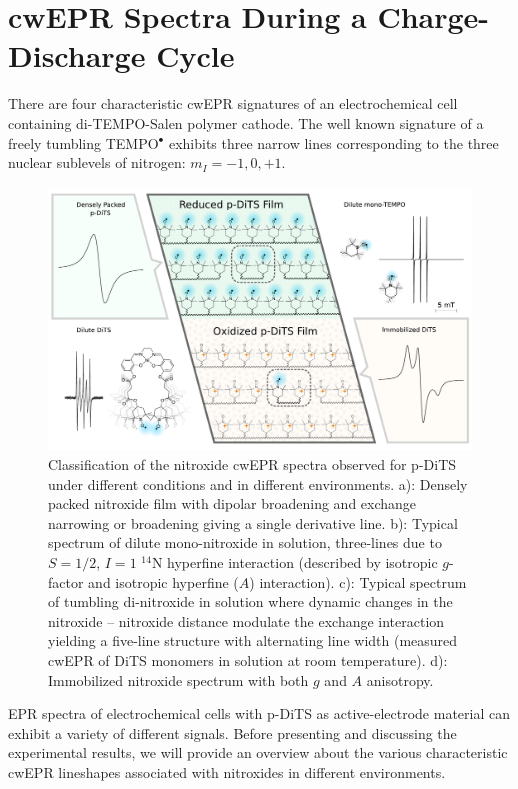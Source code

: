 \section{cwEPR Spectra During a Charge-Discharge Cycle}
There are four characteristic cwEPR signatures of an electrochemical cell containing di-TEMPO-Salen polymer cathode. The well known signature of a freely tumbling TEMPO$^{\bullet}$ exhibits three narrow lines corresponding to the three nuclear sublevels of nitrogen: $m_I=-1,0,+1$.
\begin{figure}[h]
\center
	\includegraphics[width=1\textwidth]{./operando_epr/figures/Cartoon_ALL.pdf}
	\caption{Classification of the nitroxide cwEPR spectra observed for p-DiTS under different conditions and in different environments. a): Densely packed nitroxide film with dipolar broadening and exchange narrowing or broadening giving a single derivative line. b): Typical spectrum of dilute mono-nitroxide in solution, three-lines due to $S=1/2$, $I=1$ $^{14}$N hyperfine interaction (described by isotropic $g$-factor and isotropic hyperfine ($A$) interaction). c): Typical spectrum of tumbling di-nitroxide in solution where dynamic changes in the nitroxide -- nitroxide distance modulate the exchange interaction yielding a five-line structure with alternating line width (measured cwEPR of DiTS monomers in solution at room temperature). d): Immobilized nitroxide spectrum with both $g$ and $A$ anisotropy.}
	\label{fig:cartoon_spectra_dts}
\end{figure}


EPR spectra of electrochemical cells with p-DiTS as active-electrode material can exhibit a variety of different signals. Before presenting and discussing the experimental results, we will provide an overview about the various characteristic cwEPR lineshapes associated with nitroxides in different environments.
\par

